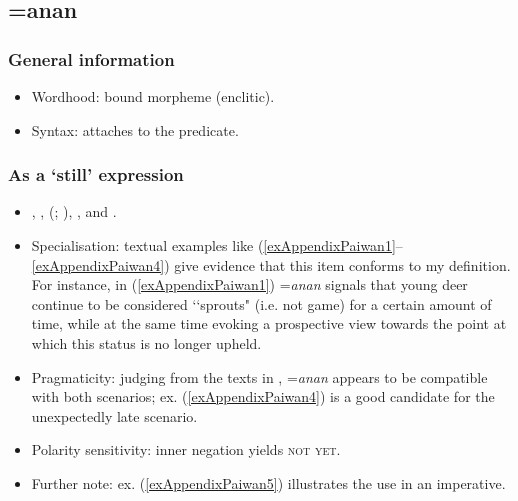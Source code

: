 \subsection{=anan}
\subsubsection{General information}
\begin{itemize}
	\item Wordhood: bound morpheme (enclitic).
	\item Syntax: attaches to the predicate.
\end{itemize}

\subsubsection{As a \lq{}still\rq{ }expression}
\begin{itemize}
	\item \textcite[228]{Chang2006}, \textcite[574]{EarlyWhitehorn2003}, \citeauthor{Egli1990} (\citeyear[164]{Egli1990}; \citeyear[29–30, 573]{Egli2002}), \textcite[13, 58, 98, 445, 478]{Ferrell1982}, \textcite[15]{Huang2012} and \textcite{Wu2006}.
	\item Specialisation: textual examples like (\ref{exAppendixPaiwan1}–\ref{exAppendixPaiwan4}) give evidence that this item conforms to my definition. For instance, in (\ref{exAppendixPaiwan1}) \mbox{=\textit{anan}} signals that young deer continue to be considered \lq\lq sprouts" (i.e. not game) for a certain amount of time, while at the same time evoking a prospective view towards the point at which this status is no longer upheld.
	\item Pragmaticity: judging from the texts in \textcite{EarlyWhitehorn2003}, \mbox{=\textit{anan}} appears to be compatible with both scenarios; ex. (\ref{exAppendixPaiwan4}) is a good candidate for the unexpectedly late scenario.
	\item Polarity sensitivity: inner negation yields \textsc{not yet}.
	\item Further note: ex. (\ref{exAppendixPaiwan5}) illustrates the use in an imperative.
\end{itemize}

